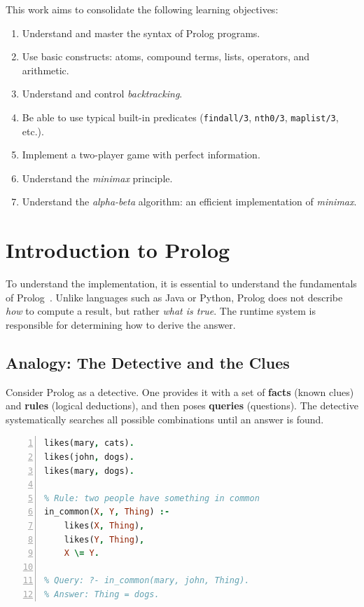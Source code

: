 This work aims to consolidate the following learning objectives:

\begin{enumerate}
  \item Understand and master the syntax of Prolog programs.
  \item Use basic constructs: atoms, compound terms, lists,
        operators, and arithmetic.
  \item Understand and control \textit{backtracking}.
  \item Be able to use typical built-in predicates
        (\texttt{findall/3}, \texttt{nth0/3}, \texttt{maplist/3}, etc.).
  \item Implement a two-player game with perfect information.
  \item Understand the \textit{minimax} principle.
  \item Understand the \textit{alpha-beta} algorithm: an efficient
        implementation of \textit{minimax}.
\end{enumerate}


\section{Introduction to Prolog}
\label{sec:prolog_intro}

To understand the implementation, it is essential to understand the
fundamentals of Prolog~\cite{bratko2001prolog, sterling1994art}. Unlike languages such as Java or Python, Prolog does
not describe \emph{how} to compute a result, but rather \emph{what is true}.
The runtime system is responsible for determining how to derive the answer.

\subsection{Analogy: The Detective and the Clues}

Consider Prolog as a detective. One provides it with a set of
\textbf{facts} (known clues) and \textbf{rules} (logical deductions),
and then poses \textbf{queries} (questions). The detective systematically
searches all possible combinations until an answer is found.

\begin{lstlisting}[language=Prolog,
    caption={Basic facts and rules in Prolog},
    label={lst:prolog_basics},
    numbers=left,
    basicstyle=\small\ttfamily,
    frame=single]
% Facts: who likes what
likes(mary, cats).
likes(john, dogs).
likes(mary, dogs).

% Rule: two people have something in common
in_common(X, Y, Thing) :-
    likes(X, Thing),
    likes(Y, Thing),
    X \= Y.

% Query: ?- in_common(mary, john, Thing).
% Answer: Thing = dogs.
\end{lstlisting}

